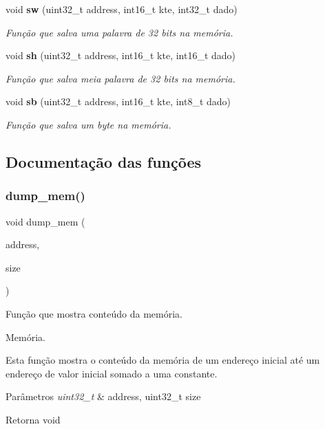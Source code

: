 \begin{DoxyCompactItemize}
void \textbf{ sw} (uint32\+\_\+t address, int16\+\_\+t kte, int32\+\_\+t dado)
\begin{DoxyCompactList}\small\item\em Função que salva uma palavra de 32 bits na memória. \end{DoxyCompactList}\item 
void \textbf{ sh} (uint32\+\_\+t address, int16\+\_\+t kte, int16\+\_\+t dado)
\begin{DoxyCompactList}\small\item\em Função que salva meia palavra de 32 bits na memória. \end{DoxyCompactList}\item 
void \textbf{ sb} (uint32\+\_\+t address, int16\+\_\+t kte, int8\+\_\+t dado)
\begin{DoxyCompactList}\small\item\em Função que salva um byte na memória. \end{DoxyCompactList}\end{DoxyCompactItemize}


\subsection{Documentação das funções}
\mbox{\label{memory_8c_ac14dd20635abe93d6caec039961437f2}} 
\subsubsection{dump\+\_\+mem()}
{\footnotesize\ttfamily void dump\+\_\+mem (\begin{DoxyParamCaption}\item[{uint32\+\_\+t}]{address,  }\item[{uint32\+\_\+t}]{size }\end{DoxyParamCaption})}



Função que mostra conteúdo da memória. 

Memória.

Esta função mostra o conteúdo da memória de um endereço inicial até um endereço de valor inicial somado a uma constante. 
\begin{DoxyParams}{Parâmetros}
{\em uint32\+\_\+t} & address, uint32\+\_\+t size \\
\hline
\end{DoxyParams}
\begin{DoxyReturn}{Retorna}
void 
\end{DoxyReturn}

